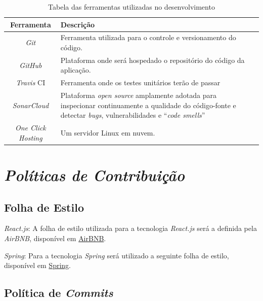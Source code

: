 \begin{apendicesenv}
\begin{table}[H]
    \centering
    \caption{Tabela das ferramentas utilizadas no desenvolvimento}
    \begin{tabularx}{\textwidth}{|c|X|c|}
        \hline
        \rowcolor[HTML]{A8DADC}
        \textbf{Ferramenta} & \textbf{Descrição} \\ \hline
        
        \textit{Git} & Ferramenta utilizada para o controle e versionamento do código.\\\hline
        
        \textit{GitHub} & Plataforma onde será hospedado o repositório do código da aplicação. \\ \hline
        
        \textit{Travis} CI & Ferramenta onde os testes unitários terão de passar\\ \hline
        
        \textit{SonarCloud} &  Plataforma \textit{open source} amplamente adotada para inspecionar continuamente a qualidade do código-fonte e detectar \textit{bugs}, vulnerabilidades e ``\textit{code smells}''\\ \hline
        
        \textit{One Click Hosting} & Um servidor Linux em nuvem.\\ \hline
    \end{tabularx}
\end{table}

\section{\textit{Políticas de Contribuição}}
\subsection*{Folha de Estilo}
\textit{React.js}: A folha de estilo utilizada para a tecnologia \textit{React.js} será a definida pela \textit{AirBNB}, disponível em \href{https://github.com/ronal2do/airbnb-react-styleguide}{AirBNB}.
 
\textit{Spring}: Para a tecnologia \textit{Spring} será utilizado a seguinte folha de estilo, disponível em  \href{https://github.com/spring-projects/spring-framework/wiki/Code-Style}{Spring}.

\subsection*{Política de \textit{Commits}}


\end{apendicesenv}
